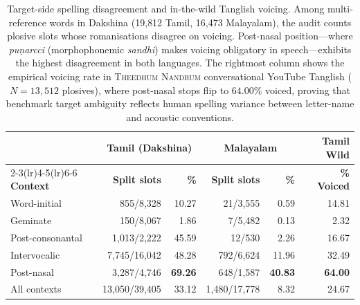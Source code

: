 \begin{table}[t]
\centering
\small
\begin{tabular}{lrrrrr}
\toprule
& \multicolumn{2}{c}{\textbf{Tamil (Dakshina)}} & \multicolumn{2}{c}{\textbf{Malayalam}} & \textbf{Tamil Wild} \\
\cmidrule(lr){2-3}\cmidrule(lr){4-5}\cmidrule(lr){6-6}
\textbf{Context} & \textbf{Split slots} & \textbf{\%} & \textbf{Split slots} & \textbf{\%} & \textbf{\% Voiced} \\
\midrule
Word-initial & 855/8,328 & 10.27 & 21/3,555 & 0.59 & 14.81 \\
Geminate & 150/8,067 & 1.86 & 7/5,482 & 0.13 & 2.32 \\
Post-consonantal & 1,013/2,222 & 45.59 & 12/530 & 2.26 & 16.67 \\
Intervocalic & 7,745/16,042 & 48.28 & 792/6,624 & 11.96 & 32.49 \\
Post-nasal & 3,287/4,746 & \textbf{69.26} & 648/1,587 & \textbf{40.83} & \textbf{64.00} \\
\midrule All contexts & 13,050/39,405 & 33.12 & 1,480/17,778 & 8.32 & 24.67 \\
\bottomrule
\end{tabular}
\caption{Target-side spelling disagreement and in-the-wild Tanglish voicing. Among multi-reference words in Dakshina (19{,}812 Tamil, 16{,}473 Malayalam), the audit counts plosive slots whose romanisations disagree on voicing. Post-nasal position---where \textit{puṇarcci} (morphophonemic \textit{sandhi}) makes voicing obligatory in speech---exhibits the highest disagreement in both languages. The rightmost column shows the empirical voicing rate in \textsc{Theedhum Nandrum} conversational YouTube Tanglish ($N=13{,}512$ plosives), where post-nasal stops flip to $64.00\%$ voiced, proving that benchmark target ambiguity reflects human spelling variance between letter-name and acoustic conventions.}
\label{tab:disagree}
\end{table}